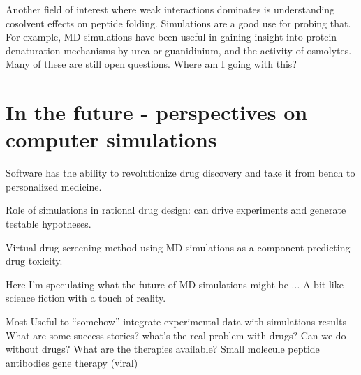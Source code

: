 Another field of interest where weak interactions dominates is understanding cosolvent effects on peptide folding. Simulations are a good use for probing that.  For example, MD simulations have been useful in gaining insight into protein denaturation mechanisms by urea or guanidinium, and the activity of osmolytes. Many of these are still open questions.\cite{http://pubs.acs.org/doi/abs/10.1021/jp200625k -- crowding and protein association.} Where am I going with this?





\section{In the future - perspectives on computer simulations}



Software has the ability to revolutionize drug discovery and take it from bench to personalized medicine.  

Role of simulations in rational drug design: can drive experiments and generate testable hypotheses.

Virtual drug screening method using MD simulations as a component predicting drug toxicity.

Here I'm speculating what the future of MD simulations might be ... A bit like science fiction with a touch of reality.

Most Useful to “somehow” integrate experimental data with simulations results\cite{that nature paper discussing integrating MD and systems biology}
- What are some success stories?
what’s the real problem with drugs?
Can we do without drugs? What are the therapies available?
Small molecule
peptide
antibodies
gene therapy (viral)
\cite{Hansen:2012hh}

